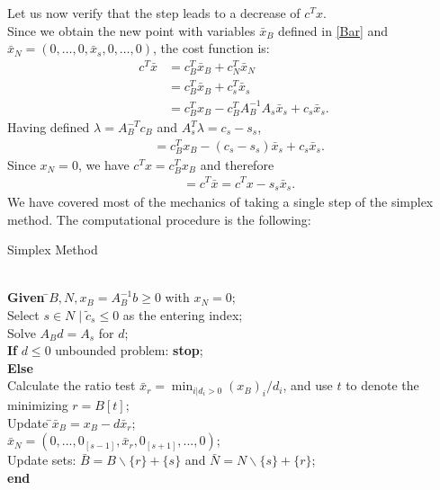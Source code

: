 \documentclass[a4paper,10 pt,titlepage,twoside]{book}
\theoremstyle{plain}
\theoremstyle{definition}
\theoremstyle{remark}
\begin{document}
Let us now verify that the step leads to a decrease of $c^{T}x$.\\
Since we obtain the new point with variables $\bar{x}_{B}$ defined in \ref{Bar} and $\bar{x}_{N}=(0,\dots, 0, \bar{x}_{s}, 0,\dots, 0)$, the cost function is:
\begin{align*}
c^{T}\bar{x} &=c^{T}_{B}\bar{x}_{B}+c^{T}_{N}\bar{x}_{N}\\
			 &=c_{B}^{T}\bar{x}_{B}+c^{T}_{s}\bar{x}_{s}\\
			 &=c_{B}^{T}x_{B}-c^{T}_{B}A_{B}^{-1}A_{s}\bar{x}_{s}+c_{s}\bar{x}_{s}.
\end{align*}
Having defined $ \lambda=A_{B}^{-T}c_{B}$ and $A^{T}_{s}\lambda = c_{s}-s_{s}$,
\begin{align*}
&= c^{T}_{B}x_{B}-(c_{s} -s_{s})\bar{x}_{s} +c_{s}\bar{x}_{s}.
\end{align*}
Since $x_{N}=0$, we have $c^{T}x=c^{T}_{B}x_{B}$ and therefore 
\begin{align*}
&=c^{T}\bar{x} = c^{T}x - s_{s}\bar{x}_{s}.
\end{align*}
We have covered most of the mechanics of taking a single step of the simplex method. The computational procedure is the following:
\\
\begin{algorithm}[H]\caption{\label{Alg:1}Simplex Method}
\begin{tabbing}
	\\
	\textbf{Given} \=$B, N, x_{B} = A_{B}^{-1}b\geq 0$ with $x_{N}=0$;\\
	\> Select $s\in N\;|\;\widetilde{c}_{s}\leq 0$ as the entering index;\\
	\> Solve $A_{B}d = A_{s}$ for $d$;\\
	\>\textbf{If} {$d \leq 0$} unbounded problem: \textbf{stop};\\
	\>\textbf{Else} \=\\
	\>\>Calculate the ratio test $\bar{x}_{r} = \min_{i | d_{i} > 0}(x_{B})_{i}/d_{i}$, and use $t$ to denote the minimizing $r = B[t]$;\\
	\>\>Update \=$\bar{x}_{B} = x_{B}-d\bar{x}_{r}$;\\
	\>\>\>$\bar{x}_{N} = (0,...,0_{[s-1]},\bar{x}_{r},0_{[s+1]},...,0)$;\\
	\>\> Update sets: $\bar{B} = B \backslash \{r\} + \{s\}$ and $\bar{N} = N \backslash \{s\} + \{r\}$;\\
	\textbf{end}
\end{tabbing}
\end{algorithm}
\end{document}

